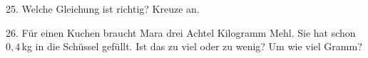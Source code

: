 \documentclass[11pt]{article}
\begin{document}
\begin{pfaufg}{}{25.}{}
Welche Gleichung ist richtig? Kreuze an.\par\smallskip {}\par {}
\end{pfaufg}

\begin{pfaufg}{}{26.}{}
Für einen Kuchen braucht Mara drei Achtel Kilogramm Mehl. Sie hat schon $0{,}4$\,kg in die Schüssel gefüllt. Ist das zu viel oder zu wenig? Um wie viel Gramm?
\end{pfaufg}

\par\vfill{}
\end{document}
